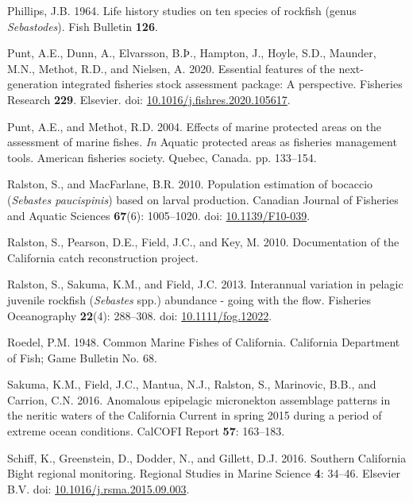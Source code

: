\documentclass[
  english,
  a4paper,
]{article}
\newlength{\cslhangindent}
\newlength{\cslentryspacingunit} %
\newenvironment{CSLReferences}[2] %
 {%
  \setlength{\parindent}{0pt}
  \ifodd #1
  \let\oldpar\par
  \def\par{\hangindent=\cslhangindent\oldpar}
  \fi
  \setlength{\parskip}{#2\cslentryspacingunit}
 }%
 {}
\begin{document}
\begin{CSLReferences}{1}{0}
\leavevmode{}%
Phillips, J.B. 1964. {Life history studies on ten species of rockfish (genus \emph{Sebastodes})}. Fish Bulletin \textbf{126}.

\leavevmode{}%
Punt, A.E., Dunn, A., Elvarsson, B.Þ., Hampton, J., Hoyle, S.D., Maunder, M.N., Methot, R.D., and Nielsen, A. 2020. {Essential features of the next-generation integrated fisheries stock assessment package: A perspective}. Fisheries Research \textbf{229}. Elsevier. doi: \href{https://doi.org/10.1016/j.fishres.2020.105617}{10.1016/j.fishres.2020.105617}.

\leavevmode{}%
Punt, A.E., and Methot, R.D. 2004. {Effects of marine protected areas on the assessment of marine fishes}. \emph{In} Aquatic protected areas as fisheries management tools. American fisheries society. Quebec, Canada. pp. 133--154.

\leavevmode{}%
Ralston, S., and MacFarlane, B.R. 2010. {Population estimation of bocaccio (\emph{Sebastes paucispinis}) based on larval production}. Canadian Journal of Fisheries and Aquatic Sciences \textbf{67}(6): 1005--1020. doi: \href{https://doi.org/10.1139/F10-039}{10.1139/F10-039}.

\leavevmode{}%
Ralston, S., Pearson, D.E., Field, J.C., and Key, M. 2010. {Documentation of the California catch reconstruction project}.

\leavevmode{}%
Ralston, S., Sakuma, K.M., and Field, J.C. 2013. {Interannual variation in pelagic juvenile rockfish (\emph{Sebastes} spp.) abundance - going with the flow}. Fisheries Oceanography \textbf{22}(4): 288--308. doi: \href{https://doi.org/10.1111/fog.12022}{10.1111/fog.12022}.

\leavevmode{}%
Roedel, P.M. 1948. {Common Marine Fishes of California}. California Department of Fish; Game Bulletin No. 68.

\leavevmode{}%
Sakuma, K.M., Field, J.C., Mantua, N.J., Ralston, S., Marinovic, B.B., and Carrion, C.N. 2016. {Anomalous epipelagic micronekton assemblage patterns in the neritic waters of the California Current in spring 2015 during a period of extreme ocean conditions}. CalCOFI Report \textbf{57}: 163--183.

\leavevmode{}%
Schiff, K., Greenstein, D., Dodder, N., and Gillett, D.J. 2016. {Southern California Bight regional monitoring}. Regional Studies in Marine Science \textbf{4}: 34--46. Elsevier B.V. doi: \href{https://doi.org/10.1016/j.rsma.2015.09.003}{10.1016/j.rsma.2015.09.003}.


\end{CSLReferences}
\end{document}
